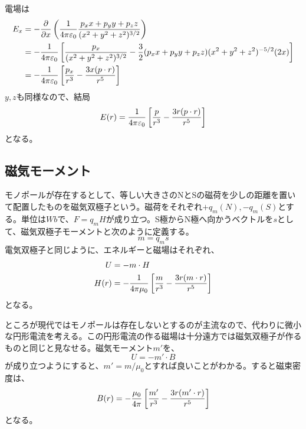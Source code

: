     電場は
    \begin{align*}
        E_x &= -\frac{\partial }{\partial x}\left(\frac{1}{4\pi\varepsilon_0}\frac{p_x x + p_y y + p_z z}{(x^2+y^2+z^2)^{3/2}}\right)\\
            &= -\frac{1}{4\pi\varepsilon_0}\left[\frac{p_x}{(x^2 + y^2 + z^2)^{3/2}} - \frac{3}{2}(p_x x + p_y y + p_z z)(x^2 + y^2 + z^2)^{-5/2}(2x) \right]\\
            &= -\frac{1}{4\pi\varepsilon_0}\left[\frac{p_x}{r^3} - \frac{3x(p \cdot r)}{r^5} \right]
    \end{align*}
    $y, z$も同様なので、結局
        \[E(r) = \frac{1}{4\pi\varepsilon_0}\left[\frac{p}{r^3} - \frac{3r(p\cdot r)}{r^5} \right]\]
    となる。

\subsection{磁気モーメント}
    モノポールが存在するとして、等しい大きさのNとSの磁荷を少しの距離を置いて配置したものを磁気双極子という。磁荷をそれぞれ$+q_m(N), -q_m(S)$とする。単位は$Wb$で、$F = q_m H$が成り立つ。S極からN極へ向かうベクトルを$s$として、磁気双極子モーメントと次のように定義する。
        \[m = q_m s\]
    電気双極子と同じように、エネルギーと磁場はそれぞれ、
    \begin{align*}
        U &= -m \cdot H\\
        H(r) &= -\frac{1}{4\pi\mu_0}\left[\frac{m}{r^3} - \frac{3r(m\cdot r)}{r^5} \right]
    \end{align*}
    となる。

    ところが現代ではモノポールは存在しないとするのが主流なので、代わりに微小な円形電流を考える。この円形電流の作る磁場は十分遠方では磁気双極子が作るものと同じと見なせる。磁気モーメント$m'$を、
        \[U = -m' \cdot B\]
    が成り立つようにすると、$m' = m / \mu_0$とすれば良いことがわかる。すると磁束密度は、
        \[B(r) = -\frac{\mu_0}{4\pi}\left[\frac{m'}{r^3} - \frac{3r(m'\cdot r)}{r^5} \right]\]
    となる。

